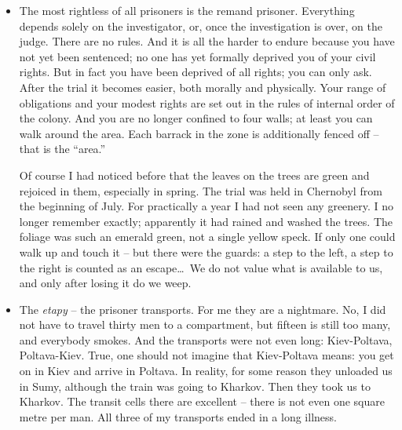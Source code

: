 \documentclass[openright]{bookest}
\begin{document}
\begin{itemize}
\item The most rightless of all prisoners is the remand prisoner. Everything depends solely on the investigator, or, once the investigation is over, on the judge. There are no rules. And it is all the harder to endure because you have not yet been sentenced; no one has yet formally deprived you of your civil rights. But in fact you have been deprived of all rights; you can only ask. After the trial it becomes easier, both morally and physically. Your range of obligations and your modest rights are set out in the rules of internal order of the colony. And you are no longer confined to four walls; at least you can walk around the area. Each barrack in the zone is additionally fenced off -- that is the ``area.''

Of course I had noticed before that the leaves on the trees are green and rejoiced in them, especially in spring. The trial was held in Chernobyl from the beginning of July. For practically a year I had not seen any greenery. I no longer remember exactly; apparently it had rained and washed the trees. The foliage was such an emerald green, not a single yellow speck. If only one could walk up and touch it -- but there were the guards: a step to the left, a step to the right is counted as an escape\ldots~We do not value what is available to us, and only after losing it do we weep.

\item The \textit{etapy} -- the prisoner transports. For me they are a nightmare. No, I did not have to travel thirty men to a compartment, but fifteen is still too many, and everybody smokes. And the transports were not even long: Kiev-Poltava, Poltava-Kiev. True, one should not imagine that Kiev-Poltava means: you get on in Kiev and arrive in Poltava. In reality, for some reason they unloaded us in Sumy, although the train was going to Kharkov. Then they took us to Kharkov. The transit cells there are excellent -- there is not even one square metre per man. All three of my transports ended in a long illness.


\end{itemize}
\end{document}
